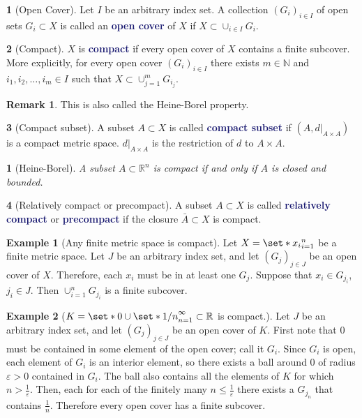 \documentclass[11pt]{article}
\numberwithin{equation}{section}
\newcommand{\navy}[1]{\textcolor{MidnightBlue}{\bf #1}}
\theoremstyle{plain}
\newtheorem{theorem}{\color{ForestGreen}{\textbf{Theorem}}}[section]
\theoremstyle{definition}
\newtheorem{definition}{\color{MidnightBlue}{\textbf{Definition}}}[section]
\newtheorem{example}{\color{WildStrawberry}Example}[section]
\newtheorem*{remark}{Remark}
\def\Set{\set*}%
\def\ss{\subset}
\newcommand{\1}{\mathbbm 1}
\newcommand{\e}{\varepsilon}
\newcommand{\RR}{\mathbb R}
\newcommand{\NN}{\mathbb N}
\begin{document}
\begin{definition}[Open Cover]
	Let $I$ be an arbitrary index set. A collection $(G_i)_{i \in I}$ of open sets $G_i \subset X$ is called an \navy{open cover} of $X$ if $X \subset \cup_{i \in I} G_{i}$.
\end{definition}

\begin{definition}[Compact]
	$X$ is \navy{compact} if every open cover of $X$ contains a finite subcover. More explicitly, for every open cover $(G_i)_{i \in I}$ there exists $m \in \NN$ and $i_1, i_2, \ldots, i_m \in I$ such that $X \subset \cup_{j=1}^m G_{i_j}$.
	\begin{remark}
		This is also called the Heine-Borel property. 
	\end{remark}
\end{definition}

\begin{definition}[Compact subset]
	A subset $A \subset X$ is called \navy{compact subset} if $(A,d\vert_{A\times A})$ is a compact metric space. $d\vert_{A\times A}$ is the restriction of $d$ to $A \times A$.  
\end{definition}

\begin{theorem}[Heine-Borel]
	A subset $A \subset \RR^n$ is compact if and only if $A$ is closed and bounded.
\end{theorem}

\begin{definition}[Relatively compact or precompact]
	A subset $A \ss X$ is called \navy{relatively compact} or \navy{precompact} if the closure $\bar{A} \ss X$ is compact. 
\end{definition}

\begin{example}[Any finite metric space is compact]
	Let $X = \Set{x_i}_{i=1}^n$ be a finite metric space. Let $J$ be an arbitrary index set, and let $(G_j)_{j \in J}$ be an open cover of $X$. Therefore, each $x_i$ must be in at least one $G_j$. Suppose that $x_i \in G_{j_i}$, $j_i \in J$. Then $\cup_{i=1}^n G_{j_i}$ is a finite subcover. 
\end{example}

\begin{example}[$K = \Set{0} \cup \Set{1/n}_{n=1}^\infty \subset \RR$ is compact.]
	Let $J$ be an arbitrary index set, and let $(G_j)_{j \in J}$ be an open cover of $K$. First note that $0$ must be contained in some element of the open cover; call it $G_i$. Since $G_i$ is open, each element of $G_i$ is an interior element, so there exists a ball around $0$ of radius $\e > 0$ contained in $G_i$. The ball also contains all the elements of $K$ for which $n > \frac{1}{\e}$. Then, each for each of the finitely many $n \leq \frac{1}{\e}$ there exists a $G_{j_n}$ that contains $\frac{1}{n}$. Therefore every open cover has a finite subcover.
\end{example}
\end{document}

